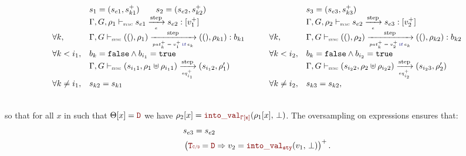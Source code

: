 \begin{skippableproof}
{\begin{minipage}{1.2\textwidth}
\begin{equation*}
\begin{array}{llcll}
                                        & s_1 = (s_{e1}, s_{k1}^+) \qquad s_2 = (s_{e2}, s_{k2}^+)                               & \quad &
                                        & s_3 = (s_{e3}, s_{k3}^+)                                                                         \\
                                        & \exprOpsem{\rho_1}{s_{e1}}{e}{s_{e2}}{v_1^+}                                           & \quad &
                                        & \exprOpsem{\rho_2}{s_{e2}}{e}{s_{e3}}{v_2^+}                                                     \\
                    \forall k,          & \patOpsem{\rho_1}{\guarded{pat_k^+ = v_1^+}{e_k}}{b_{k1}}{\rho_{k1}}                   & \quad &
                    \forall k,          & \patOpsem{\rho_2}{\guarded{pat_k^+ = v_2^+}{e_k}}{b_{k2}}{\rho_{k2}}                             \\
                    \forall k < i_1,    & b_k = \false \wedge b_{i_1} = \true                                                    & \quad &
                    \forall k < i_2,    & b_k = \false \wedge b_{i_2} = \true                                                              \\
                                        & \eqOpsem{\rho_1 \ctxconcat \rho_{{i_1}1}}{s_{{i_1}1}}{eq_{i_1}^+}{s_{{i_1}2}}{\rho'_1} & \quad &
                                        & \eqOpsem{\rho_2 \ctxconcat \rho_{{i_2}2}}{s_{{i_2}2}}{eq_{i_2}^+}{s_{{i_2}3}}{\rho'_2}           \\
                    \forall k \neq i_1, & s_{k2} = s_{k1}                                                                        & \quad &
                    \forall k \neq i_2, & s_{k3} = s_{k2},
                \end{array}
            \end{equation*}
        \end{minipage}}\\\noindent
    so that for all $x$ in  such that $\Theta[x] = \dType$ we have $\rho_2[x] =
        \intoVal{\tyCtx[x]}{\rho_1[x]}{\bot}$.
    The oversampling  on expressions
    ensures that:
    \begin{align*}
         & s_{e3} = s_{e2}                                                            \\
         & \left(\rType = \dType \Rightarrow v_2 = \intoVal{sty}{v_1}{\bot}\right)^+.
    \end{align*}

\end{skippableproof}
